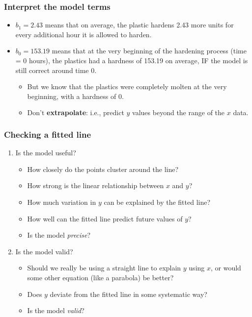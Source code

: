 \documentclass[handout]{beamer}\usepackage{graphicx, color}
\numberwithin{equation}{section}
\begin{document}
\begin{frame}
\frametitle{Interpret the model terms}
\begin{itemize}
\pause \item $b_1 = 2.43$ means that on average, the plastic hardens 2.43 more units for every additional hour it is allowed to harden.
\pause \item $b_0 = 153.19$ means that at the very beginning of the hardening process (time = 0 hours), the plastics had a hardness of 153.19 on average, IF the model is still correct around time 0.
\begin{itemize}
\pause \item But we know that the plastics were completely molten at the very beginning, with a hardness of 0.
\pause \item Don't {\bf extrapolate}: i.e., predict $y$ values beyond the range of the $x$ data.
\end{itemize}
\end{itemize}
\end{frame}

\begin{frame}
\frametitle{Checking a fitted line}

\begin{enumerate}[1. ]
\pause \item Is the model useful?
\begin{itemize}
\pause \item How closely do the points cluster around the line?
\pause \item How strong is the linear relationship between $x$ and $y$?
\pause \item How much variation in $y$ can be explained by the fitted line?  
\pause \item How well can the fitted line predict future values of $y$?
\pause \item Is the model \emph{precise}?
\end{itemize}
\pause \item Is the model valid?
\begin{itemize}
\pause \item Should we really be using a straight line to explain $y$ using $x$, or would some other equation (like a parabola) be better?
\pause \item Does $y$ deviate from the fitted line in some systematic way?
\pause \item Is the model \emph{valid}?
\end{itemize}
\end{enumerate}
\end{frame}
\end{document}

